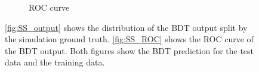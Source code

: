 \begin{figure}
\begin{subfigure}{0.5\textwidth}
        \caption{ROC curve}
        \label{fig:SS_ROC}
    \end{subfigure}%
    \caption{\autoref{fig:SS_output} shows the distribution of the BDT output split by the simulation ground truth. \autoref{fig:SS_ROC} shows the ROC curve of the BDT output. Both figures show the BDT prediction for the test data and the training data.}
\end{figure}
